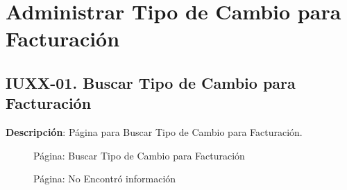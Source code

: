 \clearpage
\section{Administrar Tipo de Cambio para Facturación} \label{sec:cf-ui-admin-tipocambiofacturacion}

\subsection{IUXX-01. Buscar Tipo de Cambio para Facturación} \label{sec:ui-page-search-tipocambiofacturacion}

\textbf{Descripción}: Página para Buscar Tipo de Cambio para Facturación.\\

\begin{figure}[H]
	\label{tab:ui-search-tipocambiofacturacion-page}
	\caption{Página: Buscar Tipo de Cambio para Facturación}
\end{figure}

\begin{figure}[H]
	\label{tab:ui-nosearch-tipocambiofacturacion-page}
	\caption{Página: No Encontró información}
\end{figure}

\begin{table}[H]
	\caption{Forma: Criterios de Búsqueda}
	\label{tab:ui-search-criteria-tipocambiofacturacion-form}
\end{table}

